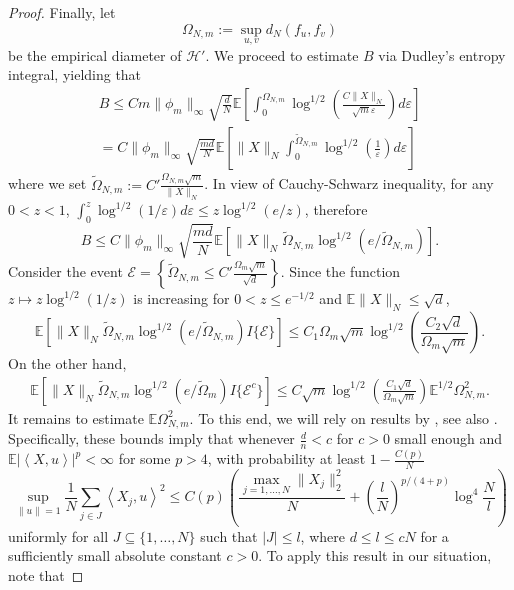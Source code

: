 \documentclass[12pt]{article}
\newcommand{\eps}{\varepsilon}
\def\l{\left}
\def\r{\right}
\newcommand{\m}{\mathcal}
\newcommand{\mb}{\mathbb}
\newcommand{\dotp}[2]{\left\langle#1,#2\right\rangle}
\theoremstyle{thmstyletwo}%
\theoremstyle{thmstylethree}%
\begin{document}
\begin{proof}
Finally, let 
\[
\Omega_{N,m}:=\sup_{u,v} d_N(f_u,f_v)
\]
be the empirical diameter of $\m H'$. We proceed to estimate $B$ via 
Dudley's entropy integral, yielding that
\begin{multline*}
    B\leq Cm \|\phi_m\|_\infty\sqrt{\frac{d}{N}}\mb E \l[\int_0^{\Omega_{N,m}} \log^{1/2}\l( \frac{C\|X\|_N}{\sqrt{m}\eps}\r)d\eps\r]
    \\
    = C\|\phi_m\|_\infty \sqrt{\frac{md}{N}}\mb E\l[ \|X\|_N \int_0^{\tilde\Omega_{N,m}}\log^{1/2}\l(\frac{1}{\eps}\r)d\eps\r]
\end{multline*}
where we set $\tilde\Omega_{N,m}:=C'\frac{\Omega_{N,m}\sqrt{m}}{\|X\|_N}$. 
In view of Cauchy-Schwarz inequality, for any $0<z<1$, $\int_0^z\log^{1/2}\l(1/\eps\r)d\eps \leq z \log^{1/2}(e/z)$, therefore 
\[
B\leq C\|\phi_m\|_\infty\sqrt{\frac{md}{N}} \mb E\l[  \|X\|_N \tilde\Omega_{N,m}\log^{1/2}\l(e/\tilde \Omega_{N,m}\r)\r].
\]
Consider the event $\m E=\l\{\tilde\Omega_{N,m}\leq C' \frac{\Omega_m \sqrt{m}}{ \sqrt{d}}\r\}$. Since the function $z\mapsto z\log^{1/2}(1/z)$ is increasing for $0<z\leq e^{-1/2}$ and $\mb E\|X\|_N\leq \sqrt{d}$, 
\begin{equation}
    \label{eq:int-1}
\mb E\l[ \|X\|_N \tilde\Omega_{N,m}\log^{1/2}\l(e/\tilde \Omega_{N,m}\r) I\{\m E\}\r]
\leq C_1 \Omega_m \sqrt{m}
\log^{1/2}\l( \frac{C_2\sqrt{d}}{\Omega_m \sqrt{m}} \r).
\end{equation}
On the other hand, 
\begin{multline*}
\mb E\l[ \|X\|_N \tilde\Omega_{N,m}\log^{1/2}\l(e/\tilde \Omega_m\r) I\{\m E^c\}\r]
\leq C\sqrt{m}\log^{1/2}\l( \frac{C_1 \sqrt{d}}{\Omega_m \sqrt{m}} \r)\mb E^{1/2} \Omega^2_{N,m}.  
\end{multline*}
It remains to estimate $\mb E  \Omega^2_{N,m}$. To this end, we will rely on results by \citet[][Theorem 3]{abdalla2022covariance}, see also \cite[Theorem 3.1]{jirak2025concentration}. Specifically, these bounds imply that whenever $\frac{d}{n}<c$ for $c>0$ small enough and $\mb E\l| \dotp{X}{u}\r|^p<\infty$ for some $p>4$, with probability at least $1-\frac{C(p)}{N}$ 
\begin{equation}
\label{eq:f_k}
   \sup_{\|u\|=1}\frac{1}{N}\sum_{j\in J} \dotp{X_j}{u}^2 \leq 
    C(p)\left(\frac{\max_{j=1,\ldots,N} \|X_j\|_2^2}{N} + \left(\frac{l}{N}\right)^{p/(4+p)} \log^4 \frac{N}{l}\right)
\end{equation}
uniformly for all $J\subseteq \{1,\ldots,N\}$ such that $|J|\leq l$, where $d\leq l\leq cN$ for a sufficiently small absolute constant $c>0$. 
To apply this result in our situation, note that 

\end{proof}
\end{document}
